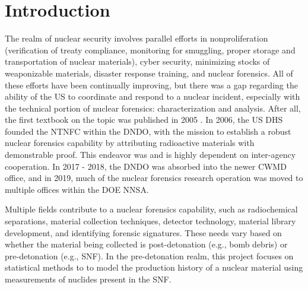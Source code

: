 
\glsresetall

\chapter{Introduction}
\label{ch:intro}

The realm of nuclear security involves parallel efforts in nonproliferation
(verification of treaty compliance, monitoring for smuggling, proper storage and
transportation of nuclear materials), cyber security, minimizing stocks of
weaponizable materials, disaster response training, and nuclear forensics. All
of these efforts have been continually improving, but there was a gap regarding
the ability of the \gls{US} to coordinate and respond to a nuclear incident,
especially with the technical portion of nuclear forensics: characterization and
analysis. After all, the first textbook on the topic was published in 2005
\cite{nftext_2005}. In 2006, the \gls{US} \gls{DHS} founded the \gls{NTNFC}
within the \gls{DNDO}, with the mission to establish a robust nuclear forensics
capability by attributing radioactive materials with demonstrable proof. This
endeavor was and is highly dependent on inter-agency cooperation. In 2017 \--
2018, the \gls{DNDO} was absorbed into the newer \gls{CWMD} office, and in 2019,
much of the nuclear forensics research operation was moved to multiple offices
within the \gls{DOE} \gls{NNSA}. 

Multiple fields contribute to a nuclear forensics capability, such as
radiochemical separations, material collection techniques, detector technology,
material library development, and identifying forensic signatures. These needs
vary based on whether the material being collected is post-detonation (e.g.,
bomb debris) or pre-detonation (e.g., \gls{SNF}).  In the
pre-detonation realm, this project focuses on statistical methods to to model
the production history of a nuclear material using measurements of nuclides
present in the \gls{SNF}.

